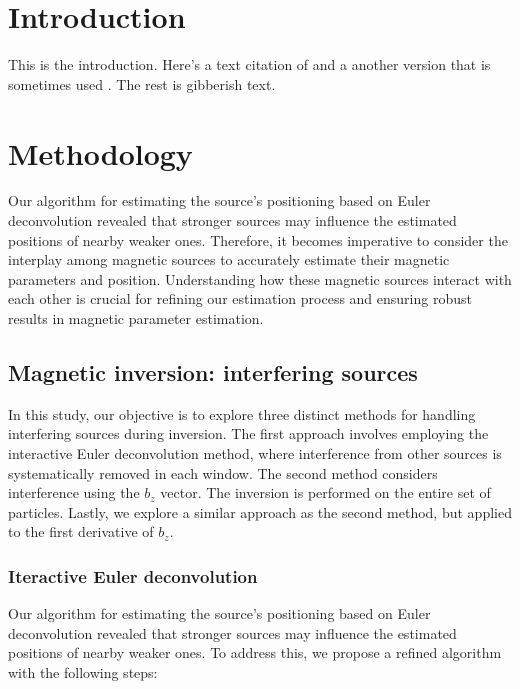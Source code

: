 \section{Introduction}

This is the introduction. Here's a text citation of \citet{OliveiraJr2015}
and a another version that is sometimes used \citep{OliveiraJr2015}.
The rest is gibberish text.




\section{Methodology}

Our algorithm for estimating the source's positioning based on Euler deconvolution revealed that stronger sources may influence the estimated positions of nearby weaker ones. Therefore, it becomes imperative to consider the interplay among magnetic sources to accurately estimate their magnetic parameters and position. Understanding how these magnetic sources interact with each other is crucial for refining our estimation process and ensuring robust results in magnetic parameter estimation.


\subsection{Magnetic inversion: interfering sources}
    
In this study, our objective is to explore three distinct methods for handling interfering sources during inversion. The first approach involves employing the interactive Euler deconvolution method, where interference from other sources is systematically removed in each window. The second method considers interference using the $b_z$ vector. The inversion is performed on the entire set of particles. Lastly, we explore a similar approach as the second method, but applied to the first derivative of $b_z$.


\subsubsection{Iteractive Euler deconvolution}

Our algorithm for estimating the source's positioning based on Euler deconvolution revealed that stronger sources may influence the estimated positions of nearby weaker ones. To address this, we propose a refined algorithm with the following steps:

